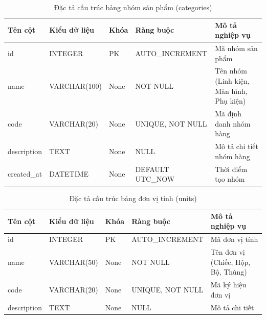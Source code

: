 \begin{table}[h!]
\centering
\caption{Đặc tả cấu trúc bảng nhóm sản phẩm (categories)}
\begin{tabular}{|l|l|l|l|l|}
\hline
\rowcolor{tablehead}
\textbf{Tên cột} & \textbf{Kiểu dữ liệu} & \textbf{Khóa} & \textbf{Ràng buộc} & \textbf{Mô tả nghiệp vụ} \\ \hline
id & INTEGER & PK & AUTO\_INCREMENT & Mã nhóm sản phẩm \\ \hline
name & VARCHAR(100) & None & NOT NULL & Tên nhóm (Linh kiện, Màn hình, Phụ kiện) \\ \hline
code & VARCHAR(20) & None & UNIQUE, NOT NULL & Mã định danh nhóm hàng \\ \hline
description & TEXT & None & NULL & Mô tả chi tiết nhóm hàng \\ \hline
created\_at & DATETIME & None & DEFAULT UTC\_NOW & Thời điểm tạo nhóm \\ \hline
\end{tabular}
\end{table}

\begin{table}[h!]
\centering
\caption{Đặc tả cấu trúc bảng đơn vị tính (units)}
\begin{tabular}{|l|l|l|l|l|}
\hline
\rowcolor{tablehead}
\textbf{Tên cột} & \textbf{Kiểu dữ liệu} & \textbf{Khóa} & \textbf{Ràng buộc} & \textbf{Mô tả nghiệp vụ} \\ \hline
id & INTEGER & PK & AUTO\_INCREMENT & Mã đơn vị tính \\ \hline
name & VARCHAR(50) & None & NOT NULL & Tên đơn vị (Chiếc, Hộp, Bộ, Thùng) \\ \hline
code & VARCHAR(20) & None & UNIQUE, NOT NULL & Mã ký hiệu đơn vị \\ \hline
description & TEXT & None & NULL & Mô tả chi tiết \\ \hline
\end{tabular}
\end{table}

